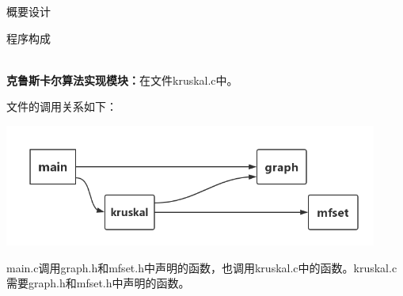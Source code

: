 \documentclass[UTF8]{ctexart}
\begin{document}
\begin{section}{概要设计}
\begin{subsection}{程序构成}



\textbf{\\克鲁斯卡尔算法实现模块：}在文件kruskal.c中。

\par{文件的调用关系如下：}

\includegraphics[height=4cm]{"fig1.png"}

main.c调用graph.h和mfset.h中声明的函数，也调用kruskal.c中的函数。kruskal.c需要graph.h和mfset.h中声明的函数。

\end{subsection}

\end{section}
\end{document}
